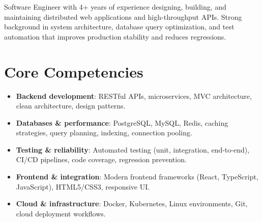 \documentclass[11pt,a4paper,sans]{moderncv}
\begin{document}
\makecvtitle


\vspace{6pt}
\small{Software Engineer with 4+ years of experience designing, building, and maintaining distributed web applications and high-throughput APIs. Strong background in system architecture, database query optimization, and test automation that improves production stability and reduces regressions.}


\section{Core Competencies}
\vspace{1pt}
\begin{itemize}

\item \textbf{Backend development}: RESTful APIs, microservices, MVC architecture, clean architecture, design patterns.

\item \textbf{Databases \& performance}: PostgreSQL, MySQL, Redis, caching strategies, query planning, indexing, connection pooling.

\item \textbf{Testing \& reliability}: Automated testing (unit, integration, end-to-end), CI/CD pipelines, code coverage, regression prevention.

\item \textbf{Frontend \& integration}: Modern frontend frameworks (React, TypeScript, JavaScript), HTML5/CSS3, responsive UI.

\item \textbf{Cloud \& infrastructure}: Docker, Kubernetes, Linux environments, Git, cloud deployment workflows.

\end{itemize}

\end{document}
